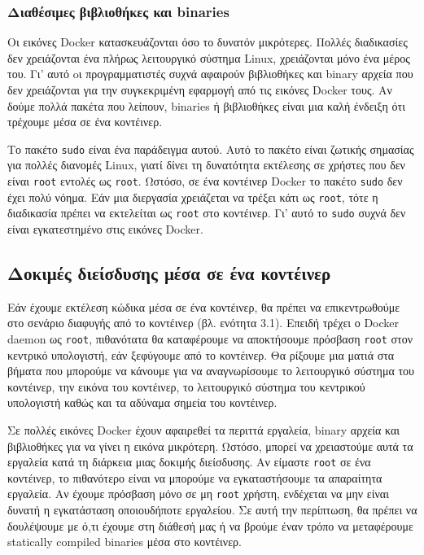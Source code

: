 \subsubsection{Διαθέσιμες βιβλιοθήκες και \textlatin{binaries}}

Οι εικόνες Docker κατασκευάζονται όσο το δυνατόν μικρότερες. Πολλές διαδικασίες
δεν χρειάζονται ένα πλήρως λειτουργικό σύστημα \textlatin{Linux}, χρειάζονται
μόνο ένα μέρος του. Γι' αυτό oι προγραμματιστές συχνά αφαιρούν βιβλιοθήκες και
\textlatin{binary} αρχεία που δεν χρειάζονται για την συγκεκριμένη εφαρμογή από
τις εικόνες \textlatin{Docker} τους. Αν δούμε πολλά πακέτα που λείπουν,
\textlatin{binaries} ή βιβλιοθήκες είναι μια καλή ένδειξη ότι τρέχουμε
μέσα σε ένα κοντέινερ.

Το πακέτο \texttt{\textlatin{sudo}} είναι ένα παράδειγμα αυτού. Αυτό το πακέτο
είναι ζωτικής σημασίας για πολλές διανομές \textlatin{Linux}, γιατί δίνει τη
δυνατότητα εκτέλεσης σε χρήστες που δεν είναι \texttt{\textlatin{root}}
εντολές ως \texttt{\textlatin{root}}. Ωστόσο, σε ένα κοντέινερ
\textlatin{Docker} το πακέτο \texttt{\textlatin{sudo}} δεν έχει πολύ νόημα. Εάν
μια διεργασία χρειάζεται να τρέξει κάτι ως \texttt{\textlatin{root}}, τότε
η διαδικασία πρέπει να εκτελείται ως \texttt{\textlatin{root}} στο κοντέινερ.
Γι' αυτό το \texttt{\textlatin{sudo}} συχνά δεν είναι εγκατεστημένο στις εικόνες
\textlatin{Docker}.


\subsection{Δοκιμές διείσδυσης μέσα σε ένα κοντέινερ}

Εάν έχουμε εκτέλεση κώδικα μέσα σε ένα κοντέινερ, θα πρέπει να επικεντρωθούμε
στο σενάριο διαφυγής από το κοντέινερ (βλ. ενότητα 3.1). Επειδή τρέχει ο
\textlatin{Docker daemon} ως \texttt{\textlatin{root}}, πιθανότατα θα
καταφέρουμε να αποκτήσουμε πρόσβαση \texttt{\textlatin{root}} στον κεντρικό
υπολογιστή, εάν ξεφύγουμε από το κοντέινερ. Θα ρίξουμε μια ματιά στα βήματα που
μπορούμε να κάνουμε για να αναγνωρίσουμε το λειτουργικό σύστημα του κοντέινερ, 
την εικόνα του κοντέινερ, το λειτουργικό σύστημα του κεντρικού υπολογιστή καθώς
και τα αδύναμα σημεία του κοντέινερ.

Σε πολλές εικόνες Docker έχουν αφαιρεθεί τα περιττά εργαλεία, \textlatin{binary}
αρχεία και βιβλιοθήκες για να γίνει η εικόνα μικρότερη. Ωστόσο, μπορεί να
χρειαστούμε αυτά τα εργαλεία κατά τη διάρκεια μιας δοκιμής διείσδυσης. Αν
είμαστε \texttt{\textlatin{root}} σε ένα κοντέινερ, το πιθανότερο είναι να 
μπορούμε να εγκαταστήσουμε τα απαραίτητα εργαλεία. Αν έχουμε πρόσβαση μόνο σε μη
\texttt{\textlatin{root}} χρήστη, ενδέχεται να μην είναι δυνατή η εγκατάσταση
οποιουδήποτε εργαλείου. Σε αυτή την περίπτωση, θα πρέπει να δουλέψουμε με ό,τι
έχουμε στη διάθεσή μας ή να βρούμε έναν τρόπο να μεταφέρουμε
\textlatin{statically compiled binaries} μέσα στο κοντέινερ.

